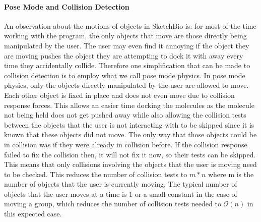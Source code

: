 \documentclass[twocolumn]{bmcart}%
\begin{document}
\paragraph*{Pose Mode and Collision Detection}
An observation about the motions of objects in SketchBio is: for most of the time working with the program, the only objects that move are those directly being manipulated by the user.  The user may even find it annoying if the object they are moving pushes the object they are attempting to dock it with away every time they accidentally collide.  Therefore one simplification that can be made to collision detection is to employ what we call pose mode physics.  In pose mode physics, only the objects directly manipulated by the user are allowed to move.  Each other object is fixed in place and does not even move due to collision response forces.  This allows an easier time docking the molecules as the molecule not being held does not get pushed away while also allowing the collision tests between the objects that the user is not interacting with to be skipped since it is known that these objects did not move.  The only way that those objects could be in collision was if they were already in collision before.  If the collision response failed to fix the collision then, it will not fix it now, so their tests can be skipped.  This means that only collisions involving the objects that the user is moving need to be checked.  This reduces the number of collision tests to $m*n$ where m is the number of objects that the user is currently moving.  The typical number of objects that the user moves at a time is 1 or a small constant in the case of moving a group, which reduces the number of collision tests needed to $\mathcal{O}(n)$ in this expected case.
\end{document}

